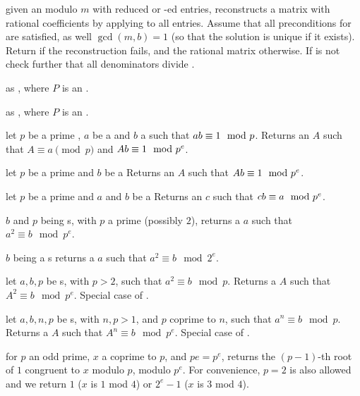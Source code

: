 given an  modulo $m$ with reduced or -ed entries,
reconstructs a matrix with rational coefficients by applying 
to all entries. Assume that all preconditions for  are
satisfied, as well $\gcd(m,b) = 1$ (so that the solution is unique if it
exists). Return  if the reconstruction fails, and the rational
matrix otherwise. If  is not  check further that all
denominators divide .

 as
, where $P$ is an .

 as
, where $P$ is an .


 let
$p$ be a prime , $a$ be a  and
$b$ a  such that $a\*b \equiv 1 \mod p$.
Returns an  $A$ such that $A \equiv a \pmod{p}$ and
$A\*b \equiv 1 \mod p^e$.

 let
$p$ be a prime  and $b$ be a 
Returns an  $A$ such that $A\*b \equiv 1 \mod p^e$.

 let
$p$ be a prime  and $a$ and $b$ be a 
Returns an  $c$ such that $c\*b \equiv a \mod p^e$.

 $b$ and $p$ being s, with $p$
a prime (possibly $2$), returns a  $a$ such that $a^2 \equiv b \mod
p^e$.

 $b$ being a s
returns a  $a$ such that $a^2 \equiv b \mod 2^e$.

 let
$a,b,p$ be s, with $p > 2$, such that $a^2\equiv b\mod p$.
Returns a  $A$ such that $A^2 \equiv b \mod p^e$. Special case
of .

 let
$a,b,n,p$ be s, with $n,p > 1$, and $p$ coprime to $n$,
such that $a^n \equiv b \mod p$. Returns a  $A$ such that
$A^n \equiv b \mod p^e$. Special case of .

 for $p$ an odd prime,
$x$ a  coprime to $p$, and $pe = p^e$, returns the $(p-1)$-th root of
$1$ congruent to $x$ modulo $p$, modulo $p^e$. For convenience, $p = 2$ is
also allowed and we return $1$ ($x$ is $1$ mod $4$) or $2^e - 1$ ($x$ is $3$
mod $4$).


